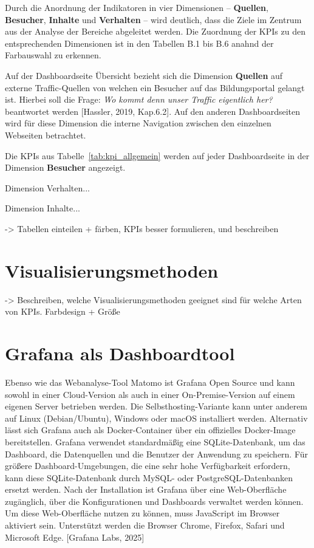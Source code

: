 Durch die Anordnung der Indikatoren in vier Dimensionen – \textbf{Quellen}, \textbf{Besucher}, \textbf{Inhalte} und \textbf{Verhalten} – wird deutlich, dass die Ziele im Zentrum aus der Analyse der Bereiche abgeleitet werden. Die Zuordnung der KPIs zu den entsprechenden Dimensionen ist in den Tabellen B.1 bis B.6 anahnd der Farbauswahl zu erkennen.

Auf der Dashboardseite \glqq Übersicht\grqq{} bezieht sich die Dimension \textbf{Quellen} auf externe Traffic-Quellen von welchen ein Besucher auf das Bildungsportal gelangt ist. Hierbei soll die Frage: \textit{\glqq Wo kommt denn unser Traffic eigentlich her?\grqq{}} beantwortet werden [Hassler, 2019, Kap.6.2]. Auf den anderen Dashboardseiten wird für diese Dimension die interne Navigation zwischen den einzelnen Webseiten betrachtet. 

Die KPIs aus Tabelle~\ref{tab:kpi_allgemein} werden auf jeder Dashboardseite in der Dimension \textbf{Besucher} angezeigt.

Dimension Verhalten...

Dimension Inhalte...

-> Tabellen einteilen + färben, KPIs besser formulieren, und beschreiben

\section{Visualisierungsmethoden}
-> Beschreiben, welche Visualisierungsmethoden geeignet sind für welche Arten von KPIs. Farbdesign + Größe

\section{Grafana als Dashboardtool}
Ebenso wie das Webanalyse-Tool Matomo ist Grafana Open Source und kann sowohl in einer Cloud-Version als auch in einer On-Premise-Version auf einem eigenen Server betrieben werden. Die Selbsthosting-Variante kann unter anderem auf Linux (Debian/Ubuntu), Windows oder macOS installiert werden. Alternativ lässt sich Grafana auch als Docker-Container über ein offizielles Docker-Image bereitstellen. Grafana verwendet standardmäßig eine SQLite-Datenbank, um das Dashboard, die Datenquellen und die Benutzer der Anwendung zu speichern. Für größere Dashboard-Umgebungen, die eine sehr hohe Verfügbarkeit erfordern, kann diese SQLite-Datenbank durch MySQL- oder PostgreSQL-Datenbanken ersetzt werden. Nach der Installation ist Grafana über eine Web-Oberfläche zugänglich, über die Konfigurationen und Dashboards verwaltet werden können. Um diese Web-Oberfläche nutzen zu können, muss JavaScript im Browser aktiviert sein. Unterstützt werden die Browser Chrome, Firefox, Safari und Microsoft Edge. [Grafana Labs, 2025]

